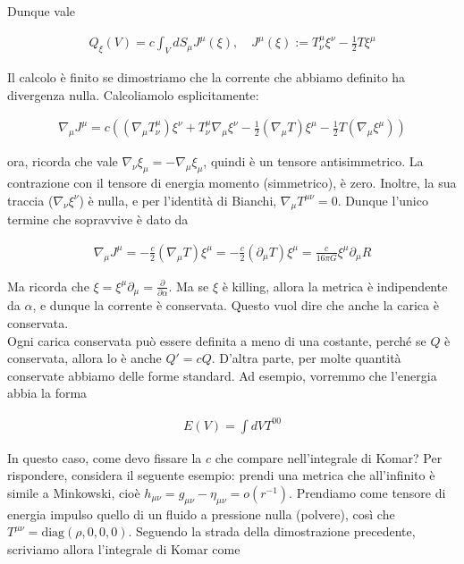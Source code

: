 \documentclass{report}
\begin{document}
Dunque vale 

\begin{align}
    Q_\xi(V) = c\int_V dS_\mu J^\mu(\xi), \quad J^\mu(\xi) := T^\mu_\nu \xi^\nu - \frac{1}{2}T\xi^\mu
\end{align}

Il calcolo è finito se dimostriamo che la corrente che abbiamo definito ha divergenza nulla. Calcoliamolo esplicitamente: 

\begin{align}
    \nabla_\mu J^\mu = c((\nabla_\mu T^\mu_\nu) \xi^\nu + T^\mu_\nu \nabla_\mu \xi^\nu - \frac{1}{2}(\nabla_\mu T)\xi^\mu - \frac{1}{2}T (\nabla_\mu \xi^\mu))
\end{align}

ora, ricorda che vale  \(\nabla_\nu \xi_\mu = -\nabla_\mu \xi_\mu\), quindi è un tensore antisimmetrico. La contrazione con il tensore di energia momento (simmetrico), è zero. Inoltre, la sua traccia (\(\nabla_\nu \xi^\nu\)) è nulla, e per l'identità di Bianchi, \(\nabla_\mu T^{\mu\nu} = 0\). Dunque l'unico termine che sopravvive è dato da 

\begin{align}
    \nabla_\mu J^{\mu} = -\frac{c}{2}(\nabla_\mu T)\xi^\mu = -\frac{c}{2}(\partial_\mu T)\xi^\mu = \frac{c}{16\pi G}\xi^\mu \partial_\mu R 
\end{align}

Ma ricorda che \(\xi = \xi^\mu \partial_\mu = \frac{\partial}{\partial \alpha}\). Ma se \(\xi\) è killing, allora la metrica è indipendente da \(\alpha\), e dunque la corrente è conservata. Questo vuol dire che anche la carica è conservata. \\


Ogni carica conservata può essere definita a meno di una costante, perché se \(Q\) è conservata, allora lo è anche \(Q' = cQ\). D'altra parte, per molte quantità conservate abbiamo delle forme standard. Ad esempio, vorremmo che l'energia abbia la forma 

\begin{align}
    E(V) = \int dV T^{00}
\end{align}

In questo caso, come devo fissare la \(c\) che compare nell'integrale di Komar? Per rispondere, considera il seguente esempio: prendi una metrica che all'infinito è simile a Minkowski, cioè \(h_{\mu\nu} = g_{\mu\nu} - \eta_{\mu\nu} = o(r^{-1})\). Prendiamo come tensore di energia impulso quello di un fluido a pressione nulla (polvere), così che  \(T^{\mu\nu} = \text{diag}(\rho, 0, 0, 0)\). Seguendo la strada della dimostrazione precedente, scriviamo allora l'integrale di Komar come 
\end{document}
